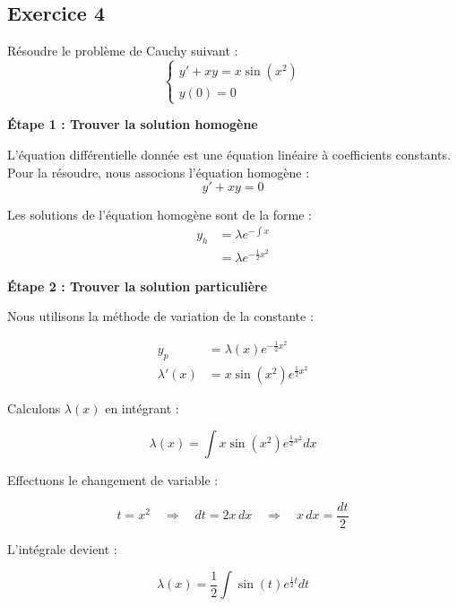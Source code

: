 \documentclass{article}
\begin{document}
\subsection{Exercice 4}
Résoudre le problème de Cauchy suivant :
\begin{equation*}
\begin{cases}
    y' + xy = x\sin(x^2) \\
    y(0)=0
\end{cases}
\end{equation*}

\textbf{Étape 1 : Trouver la solution homogène}

L'équation différentielle donnée est une équation linéaire à coefficients constants. Pour la résoudre, nous associons l'équation homogène :
\begin{equation*}
y' + xy = 0
\end{equation*}

Les solutions de l'équation homogène sont de la forme :
\begin{align*}
    y_h &= \lambda e^{-\!\int\!x} \\
    &= \lambda e^{-\frac{1}{2}x^2}
\end{align*}


\textbf{Étape 2 : Trouver la solution particulière}

Nous utilisons la méthode de variation de la constante :

\begin{align*}
y_p &= \lambda(x) e^{ - \frac{1}{2} x^2 } \\
\lambda'(x) &= x\sin(x^2) e^{ \frac{1}{2} x^2 }
\end{align*}

Calculons \(\lambda(x)\) en intégrant :

\begin{equation*}
\lambda(x) = \int x\sin(x^2) e^{ \frac{1}{2} x^2 } dx
\end{equation*}

Effectuons le changement de variable :

\begin{equation*}
t = x^2 \quad \Rightarrow \quad dt = 2x\,dx \quad \Rightarrow \quad x\,dx = \frac{dt}{2}
\end{equation*}

L'intégrale devient :

\begin{equation*}
\lambda(x) = \frac{1}{2} \int \sin(t) e^{ \frac{1}{2} t } dt
\end{equation*}
\end{document}
